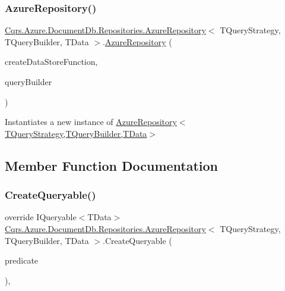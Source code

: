 \subsubsection{\texorpdfstring{Azure\+Repository()}{AzureRepository()}}
{\footnotesize\ttfamily \hyperlink{classCqrs_1_1Azure_1_1DocumentDb_1_1Repositories_1_1AzureRepository}{Cqrs.\+Azure.\+Document\+Db.\+Repositories.\+Azure\+Repository}$<$ T\+Query\+Strategy, T\+Query\+Builder, T\+Data $>$.\hyperlink{classCqrs_1_1Azure_1_1DocumentDb_1_1Repositories_1_1AzureRepository}{Azure\+Repository} (\begin{DoxyParamCaption}\item[{Func$<$ \hyperlink{interfaceCqrs_1_1DataStores_1_1IDataStore}{I\+Data\+Store}$<$ T\+Data $>$$>$}]{create\+Data\+Store\+Function,  }\item[{T\+Query\+Builder}]{query\+Builder }\end{DoxyParamCaption})\hspace{0.3cm}{\ttfamily [protected]}}



Instantiates a new instance of \hyperlink{classCqrs_1_1Azure_1_1DocumentDb_1_1Repositories_1_1AzureRepository_a0cd5703c46fde3eeefcb02b1d0113640_a0cd5703c46fde3eeefcb02b1d0113640}{Azure\+Repository$<$\+T\+Query\+Strategy,\+T\+Query\+Builder,\+T\+Data$>$} 



\subsection{Member Function Documentation}
\mbox{\label{classCqrs_1_1Azure_1_1DocumentDb_1_1Repositories_1_1AzureRepository_ac9ceeed80a02ced9a45b3443cd1f453f_ac9ceeed80a02ced9a45b3443cd1f453f}} 
\subsubsection{\texorpdfstring{Create\+Queryable()}{CreateQueryable()}}
{\footnotesize\ttfamily override I\+Queryable$<$T\+Data$>$ \hyperlink{classCqrs_1_1Azure_1_1DocumentDb_1_1Repositories_1_1AzureRepository}{Cqrs.\+Azure.\+Document\+Db.\+Repositories.\+Azure\+Repository}$<$ T\+Query\+Strategy, T\+Query\+Builder, T\+Data $>$.Create\+Queryable (\begin{DoxyParamCaption}\item[{Expression$<$ Func$<$ T\+Data, bool $>$$>$}]{predicate }\end{DoxyParamCaption})\hspace{0.3cm}{\ttfamily [protected]}, {\ttfamily [virtual]}}



